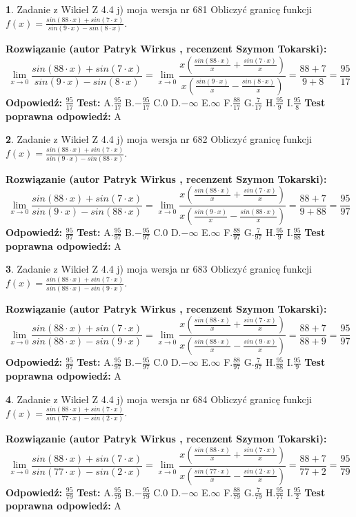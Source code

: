 \documentclass[12pt, a4paper]{article}
\theoremstyle{definition} %
\newtheorem{zad}{}
\newcommand{\zadStart}[1]{\begin{zad}#1\newline}
\newcommand{\zadStop}{\end{zad}}
\newcommand{\rozwStart}[2]{\noindent \textbf{Rozwiązanie (autor #1 , recenzent #2): }\newline}
\newcommand{\rozwStop}{\newline}
\newcommand{\odpStart}{\noindent \textbf{Odpowiedź:}\newline}
\newcommand{\odpStop}{\newline}
\newcommand{\testStart}{\noindent \textbf{Test:}\newline}
\newcommand{\testStop}{\newline}
\newcommand{\kluczStart}{\noindent \textbf{Test poprawna odpowiedź:}\newline}
\newcommand{\kluczStop}{\newline}
\begin{document}
\zadStart{Zadanie z Wikieł Z 4.4 j) moja wersja nr 681}
Obliczyć granicę funkcji $f(x)=\frac{sin(88\cdot x) +sin(7\cdot x)}{sin(9\cdot x) -sin(8\cdot x)}$.
\zadStop
\rozwStart{Patryk Wirkus}{Szymon Tokarski}
$$\lim\limits_{x\to 0}\frac{sin(88\cdot x) +sin(7\cdot x)}{sin(9\cdot x) -sin(8\cdot x)}=\lim\limits_{x\to 0}\frac{x(\frac{sin(88\cdot x)}{x}+\frac{sin(7\cdot x)}{x})}{x(\frac{sin(9\cdot x)}{x}-\frac{sin(8\cdot x)}{x})}=\frac{88+7}{9+8} = \frac{95}{17}$$
\rozwStop
\odpStart
$\frac{95}{17}$
\odpStop
\testStart
A.$\frac{95}{17}$
B.$-\frac{95}{17}$
C.$0$
D.$-\infty$
E.$\infty$
F.$\frac{88}{17}$
G.$\frac{7}{17}$
H.$\frac{95}{9}$
I.$\frac{95}{8}$
\testStop
\kluczStart
A
\kluczStop



\zadStart{Zadanie z Wikieł Z 4.4 j) moja wersja nr 682}
Obliczyć granicę funkcji $f(x)=\frac{sin(88\cdot x) +sin(7\cdot x)}{sin(9\cdot x) -sin(88\cdot x)}$.
\zadStop
\rozwStart{Patryk Wirkus}{Szymon Tokarski}
$$\lim\limits_{x\to 0}\frac{sin(88\cdot x) +sin(7\cdot x)}{sin(9\cdot x) -sin(88\cdot x)}=\lim\limits_{x\to 0}\frac{x(\frac{sin(88\cdot x)}{x}+\frac{sin(7\cdot x)}{x})}{x(\frac{sin(9\cdot x)}{x}-\frac{sin(88\cdot x)}{x})}=\frac{88+7}{9+88} = \frac{95}{97}$$
\rozwStop
\odpStart
$\frac{95}{97}$
\odpStop
\testStart
A.$\frac{95}{97}$
B.$-\frac{95}{97}$
C.$0$
D.$-\infty$
E.$\infty$
F.$\frac{88}{97}$
G.$\frac{7}{97}$
H.$\frac{95}{9}$
I.$\frac{95}{88}$
\testStop
\kluczStart
A
\kluczStop



\zadStart{Zadanie z Wikieł Z 4.4 j) moja wersja nr 683}
Obliczyć granicę funkcji $f(x)=\frac{sin(88\cdot x) +sin(7\cdot x)}{sin(88\cdot x) -sin(9\cdot x)}$.
\zadStop
\rozwStart{Patryk Wirkus}{Szymon Tokarski}
$$\lim\limits_{x\to 0}\frac{sin(88\cdot x) +sin(7\cdot x)}{sin(88\cdot x) -sin(9\cdot x)}=\lim\limits_{x\to 0}\frac{x(\frac{sin(88\cdot x)}{x}+\frac{sin(7\cdot x)}{x})}{x(\frac{sin(88\cdot x)}{x}-\frac{sin(9\cdot x)}{x})}=\frac{88+7}{88+9} = \frac{95}{97}$$
\rozwStop
\odpStart
$\frac{95}{97}$
\odpStop
\testStart
A.$\frac{95}{97}$
B.$-\frac{95}{97}$
C.$0$
D.$-\infty$
E.$\infty$
F.$\frac{88}{97}$
G.$\frac{7}{97}$
H.$\frac{95}{88}$
I.$\frac{95}{9}$
\testStop
\kluczStart
A
\kluczStop



\zadStart{Zadanie z Wikieł Z 4.4 j) moja wersja nr 684}
Obliczyć granicę funkcji $f(x)=\frac{sin(88\cdot x) +sin(7\cdot x)}{sin(77\cdot x) -sin(2\cdot x)}$.
\zadStop
\rozwStart{Patryk Wirkus}{Szymon Tokarski}
$$\lim\limits_{x\to 0}\frac{sin(88\cdot x) +sin(7\cdot x)}{sin(77\cdot x) -sin(2\cdot x)}=\lim\limits_{x\to 0}\frac{x(\frac{sin(88\cdot x)}{x}+\frac{sin(7\cdot x)}{x})}{x(\frac{sin(77\cdot x)}{x}-\frac{sin(2\cdot x)}{x})}=\frac{88+7}{77+2} = \frac{95}{79}$$
\rozwStop
\odpStart
$\frac{95}{79}$
\odpStop
\testStart
A.$\frac{95}{79}$
B.$-\frac{95}{79}$
C.$0$
D.$-\infty$
E.$\infty$
F.$\frac{88}{79}$
G.$\frac{7}{79}$
H.$\frac{95}{77}$
I.$\frac{95}{2}$
\testStop
\kluczStart
A
\kluczStop
\end{document}
